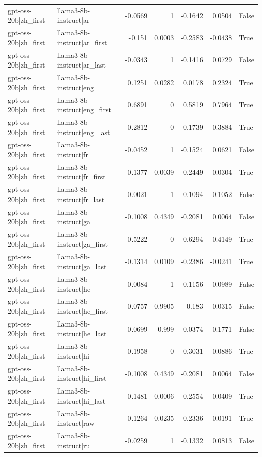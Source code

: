 \begin{table}
\begin{tabular}{l l r r r r l}
gpt-oss-20b|zh_first & llama3-8b-instruct|ar & -0.0569 & 1 & -0.1642 & 0.0504 & False \\
gpt-oss-20b|zh_first & llama3-8b-instruct|ar_first & -0.151 & 0.0003 & -0.2583 & -0.0438 & True \\
gpt-oss-20b|zh_first & llama3-8b-instruct|ar_last & -0.0343 & 1 & -0.1416 & 0.0729 & False \\
gpt-oss-20b|zh_first & llama3-8b-instruct|eng & 0.1251 & 0.0282 & 0.0178 & 0.2324 & True \\
gpt-oss-20b|zh_first & llama3-8b-instruct|eng_first & 0.6891 & 0 & 0.5819 & 0.7964 & True \\
gpt-oss-20b|zh_first & llama3-8b-instruct|eng_last & 0.2812 & 0 & 0.1739 & 0.3884 & True \\
gpt-oss-20b|zh_first & llama3-8b-instruct|fr & -0.0452 & 1 & -0.1524 & 0.0621 & False \\
gpt-oss-20b|zh_first & llama3-8b-instruct|fr_first & -0.1377 & 0.0039 & -0.2449 & -0.0304 & True \\
gpt-oss-20b|zh_first & llama3-8b-instruct|fr_last & -0.0021 & 1 & -0.1094 & 0.1052 & False \\
gpt-oss-20b|zh_first & llama3-8b-instruct|ga & -0.1008 & 0.4349 & -0.2081 & 0.0064 & False \\
gpt-oss-20b|zh_first & llama3-8b-instruct|ga_first & -0.5222 & 0 & -0.6294 & -0.4149 & True \\
gpt-oss-20b|zh_first & llama3-8b-instruct|ga_last & -0.1314 & 0.0109 & -0.2386 & -0.0241 & True \\
gpt-oss-20b|zh_first & llama3-8b-instruct|he & -0.0084 & 1 & -0.1156 & 0.0989 & False \\
gpt-oss-20b|zh_first & llama3-8b-instruct|he_first & -0.0757 & 0.9905 & -0.183 & 0.0315 & False \\
gpt-oss-20b|zh_first & llama3-8b-instruct|he_last & 0.0699 & 0.999 & -0.0374 & 0.1771 & False \\
gpt-oss-20b|zh_first & llama3-8b-instruct|hi & -0.1958 & 0 & -0.3031 & -0.0886 & True \\
gpt-oss-20b|zh_first & llama3-8b-instruct|hi_first & -0.1008 & 0.4349 & -0.2081 & 0.0064 & False \\
gpt-oss-20b|zh_first & llama3-8b-instruct|hi_last & -0.1481 & 0.0006 & -0.2554 & -0.0409 & True \\
gpt-oss-20b|zh_first & llama3-8b-instruct|raw & -0.1264 & 0.0235 & -0.2336 & -0.0191 & True \\
gpt-oss-20b|zh_first & llama3-8b-instruct|ru & -0.0259 & 1 & -0.1332 & 0.0813 & False \\

\end{tabular}
\end{table}
